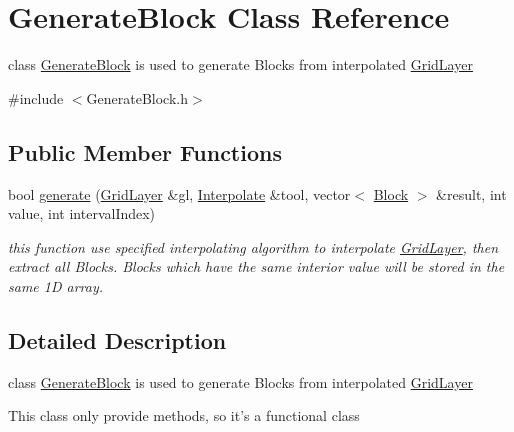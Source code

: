 \hypertarget{classGenerateBlock}{\section{\-Generate\-Block \-Class \-Reference}
\label{classGenerateBlock}
}


class \hyperlink{classGenerateBlock}{\-Generate\-Block} is used to generate \-Blocks from interpolated \hyperlink{classGridLayer}{\-Grid\-Layer}  




{\ttfamily \#include $<$\-Generate\-Block.\-h$>$}

\subsection*{\-Public \-Member \-Functions}
\begin{DoxyCompactItemize}
\item 
bool \hyperlink{classGenerateBlock_a03b4af01be301dc88176c125a91c3a83}{generate} (\hyperlink{classGridLayer}{\-Grid\-Layer} \&gl, \hyperlink{classInterpolate}{\-Interpolate} \&tool, vector$<$ \hyperlink{classBlock}{\-Block} $>$ \&result, int value, int interval\-Index)
\begin{DoxyCompactList}\small\item\em this function use specified interpolating algorithm to interpolate \hyperlink{classGridLayer}{\-Grid\-Layer}, then extract all \-Blocks. \-Blocks which have the same interior value will be stored in the same 1\-D array. \end{DoxyCompactList}\end{DoxyCompactItemize}


\subsection{\-Detailed \-Description}
class \hyperlink{classGenerateBlock}{\-Generate\-Block} is used to generate \-Blocks from interpolated \hyperlink{classGridLayer}{\-Grid\-Layer} 

\-This class only provide methods, so it's a functional class 

